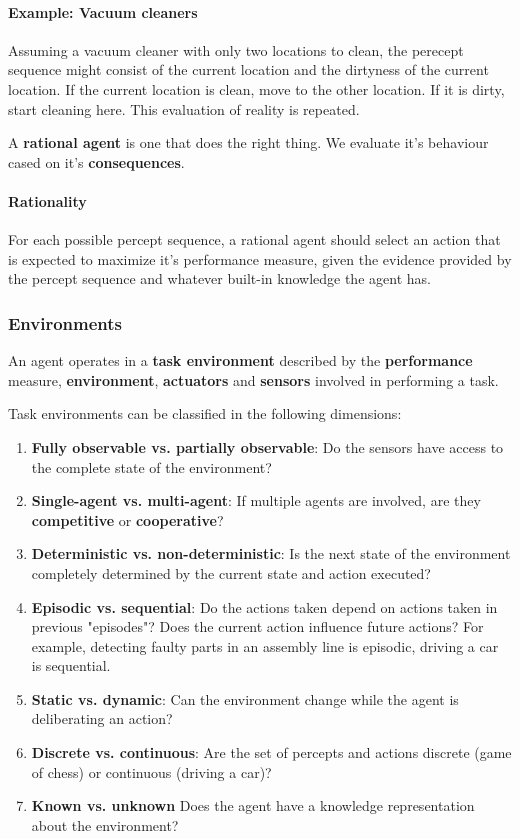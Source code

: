 \paragraph{Example: Vacuum cleaners} Assuming a vacuum cleaner with only two locations to clean, the perecept sequence might consist of the current location and the dirtyness of the current location. If the current location is clean, move to the other location. If it is dirty, start cleaning here. This evaluation of reality is repeated.

A \textbf{rational agent} is one that does the right thing. We evaluate it's behaviour cased on it's \textbf{consequences}.

\paragraph{Rationality} For each possible percept sequence, a rational agent should select an action that is expected to maximize it's performance measure, given the evidence provided by the percept sequence and whatever built-in knowledge the agent has.

\subsubsection{Environments}

An agent operates in a \textbf{task environment} described by the \textbf{performance} measure, \textbf{environment}, \textbf{actuators} and \textbf{sensors} involved in performing a task.

Task environments can be classified in the following dimensions:

\begin{enumerate}
	\item \textbf{Fully observable vs. partially observable}: Do the sensors have access to the complete state of the environment? 
	\item \textbf{Single-agent vs. multi-agent}: If multiple agents are involved, are they \textbf{competitive} or \textbf{cooperative}?   
	\item \textbf{Deterministic vs. non-deterministic}: Is the next state of the environment completely determined by the current state and action executed?
	\item \textbf{Episodic vs. sequential}: Do the actions taken depend on actions taken in previous "episodes"? Does the current action influence future actions? For example, detecting faulty parts in an assembly line is episodic, driving a car is sequential. 
	\item \textbf{Static vs. dynamic}: Can the environment change while the agent is deliberating an action?
	\item \textbf{Discrete vs. continuous}: Are the set of percepts and actions discrete (game of chess) or continuous (driving a car)?
	\item \textbf{Known vs. unknown} Does the agent have a knowledge representation about the environment? 
\end{enumerate}

